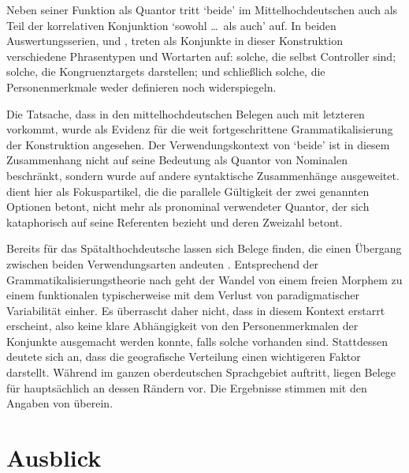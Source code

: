 Neben seiner Funktion als Quantor tritt `beide' im Mittelhochdeutschen
auch als Teil der korrelativen Konjunktion 
`sowohl \dots\ als auch' auf. In beiden Auswertungs\-serien,
\CAO{} und \KC{}, treten als Konjunkte in dieser Konstruktion
verschiedene Phrasen\-typen und Wort\-arten auf: solche, die selbst Controller
sind; solche, die Kongruenztargets darstellen; und schließlich solche, die
Personenmerkmale weder definieren noch widerspiegeln.

Die Tatsache, dass  in den mittelhochdeutschen Belegen auch mit
letzteren vorkommt, wurde als Evidenz für die weit fortgeschrittene
Grammatikalisierung der Konstruktion angesehen. Der Verwendungskontext von
`beide' ist in diesem Zusammenhang nicht auf seine Bedeutung als Quantor
von Nominalen beschränkt, sondern wurde auf andere syntaktische Zusammenhänge
ausgeweitet.  dient hier als Fokuspartikel, die die parallele
Gültigkeit der zwei genannten Optionen betont, nicht mehr als pronominal
verwendeter Quantor, der sich kataphorisch auf seine Referenten bezieht und
deren Zweizahl betont.

Bereits für das Spätalthochdeutsche lassen sich Belege finden, die einen
Übergang zwischen beiden Verwendungsarten andeuten \autocite[vgl.\ die
Beispiele in][627]{ksw2}. Entsprechend der Grammatikalisierungstheorie nach
\citet[146--150]{lehmann2015} geht der Wandel von einem freien Morphem zu einem
funktionalen typischerweise mit dem Verlust von paradigmatischer Variabilität
einher. Es überrascht daher nicht, dass  in diesem Kontext
erstarrt erscheint, also keine klare Abhängigkeit von den Personenmerkmalen der
Konjunkte ausgemacht werden konnte, falls solche vorhanden sind. Stattdessen
deutete sich an, dass die geografische Verteilung einen wichtigeren Faktor
darstellt. Während  im ganzen oberdeutschen Sprachgebiet auftritt,
liegen Belege für  hauptsächlich an dessen Rändern vor. Die
Ergebnisse stimmen mit den Angaben von \citet[627--628]{ksw2} überein.

\section{Ausblick}

